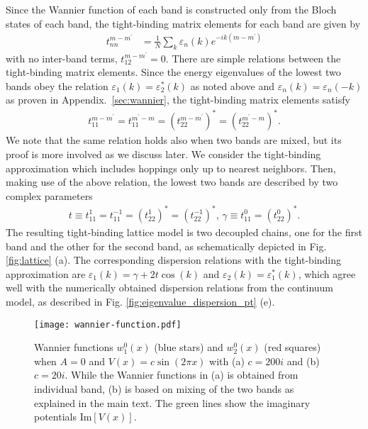\documentclass[prb,superscriptaddress,floatfix,twocolumn,showpacs]{revtex4-2}
\begin{document}
Since the Wannier function of each band is constructed only from the Bloch states of each band, the tight-binding matrix elements for each band are given by
\begin{align}
    t_{nn}^{m-m^\prime} &= \frac{1}{N}\sum_{k}\varepsilon_n (k)e^{-ik (m-m^\prime)}
\label{eq:hopping_singleband}
\end{align}
with no inter-band terms, $t_{12}^{m-m^\prime} = 0$.
There are simple relations between the tight-binding matrix elements.
Since the energy eigenvalues of the lowest two bands obey the relation $\varepsilon_1 (k) = \varepsilon_2^\ast (k)$ as noted above and $\varepsilon_n (k) = \varepsilon_n (-k)$ as proven in Appendix.~\ref{sec:wannier}, the tight-binding matrix elements satisfy 
\begin{align}
    t_{11}^{m-m^\prime} = t_{11}^{m^\prime - m} = (t_{22}^{m-m^\prime})^* = (t_{22}^{m^\prime-m})^*.
    \label{eq:symmetry_singleband}
\end{align}
We note that the same relation holds also when two bands are mixed, but its proof is more involved as we discuss later. 
We consider the tight-binding approximation which includes hoppings only up to nearest neighbors. 
Then, making use of the above relation, the lowest two bands are described by two complex parameters
\begin{align}
    t \equiv t_{11}^{1} = t_{11}^{-1} = (t_{22}^{1})^* = (t_{22}^{-1})^*,\,    \gamma \equiv t_{11}^0 = (t_{22}^0)^*.
    \label{eq:parameters_truncated}
\end{align}
The resulting tight-binding lattice model is two decoupled chains, one for the first band and the other for the second band, as schematically depicted in Fig. \ref{fig:lattice} (a).
The corresponding dispersion relations with the tight-binding approximation are $\varepsilon_1 (k) = \gamma + 2t\cos (k)$ and $\varepsilon_2 (k) = \varepsilon_1^\ast(k)$, which agree well with the numerically obtained dispersion relations from the continuum model, as described in Fig. \ref{fig:eigenvalue_dispersion_pt} (e).

\begin{figure}[tbp]
    \centering
    \texttt{[image: wannier-function.pdf]}
    \caption{Wannier functions $w_1^0(x)$ (blue stars) and $w_2^0(x)$ (red squares) when $A = 0$ and $V(x) = c\sin (2\pi x)$ with (a) $c=200i$ and  (b) $c=20i$. 
    While the Wannier functions in (a) is obtained from individual band, (b) is based on mixing of the two bands as explained in the main text. 
    The green lines show the imaginary potentials $\mathrm{Im}[V(x)]$.}
    \label{fig:wannier-function}
\end{figure}
\end{document}
